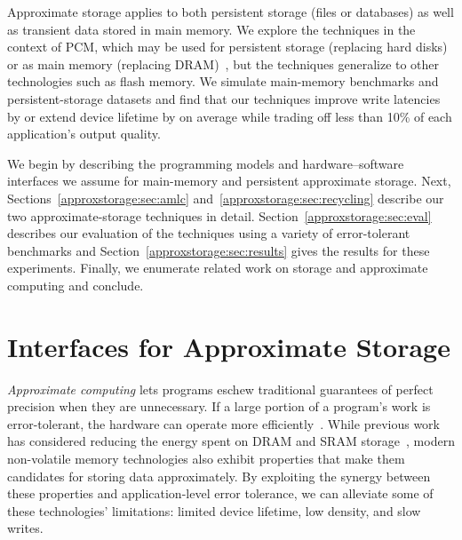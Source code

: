 Approximate storage applies to both persistent storage (files or databases) as well as transient
data stored in main memory.
We explore the techniques in the context of PCM, which may be used for
persistent storage (replacing hard disks) or as main memory
(replacing DRAM)~\cite{pcm-dram-alt,durable-pcm-mm,qureshi-pcm-mm},
but the techniques generalize to other technologies such as flash memory.
We simulate main-memory benchmarks and
persistent-storage datasets and find that our techniques improve write
latencies by  or extend device lifetime by
 on
average while trading off less than 10\% of each application's output quality.

We begin by describing the programming models and hardware--software interfaces
we assume for main-memory and persistent approximate storage. Next,
Sections~\ref{approxstorage:sec:amlc} and~\ref{approxstorage:sec:recycling} describe our two
approximate-storage techniques in detail. Section~\ref{approxstorage:sec:eval} describes our
evaluation of the techniques using a variety of error-tolerant
benchmarks and Section~\ref{approxstorage:sec:results} gives the results for these
experiments. Finally, we enumerate related work on storage and approximate
computing and conclude.

\section{Interfaces for Approximate Storage}
\label{approxstorage:sec:idea}


\emph{Approximate computing} lets programs
eschew traditional guarantees of perfect precision when they are
unnecessary. If a large portion of a program's work is
error-tolerant, the hardware can operate more
efficiently~\cite{flikker,truffle,pcmos,stochasticproc,relax}.
While previous work has considered reducing the energy spent on DRAM
and SRAM storage~\cite{flikker,enerj,truffle}, modern non-volatile
memory technologies also exhibit properties that make them candidates
for storing data approximately. By exploiting the synergy between
these properties and application-level error tolerance, we can alleviate
some of these technologies' limitations: limited device
lifetime, low density, and slow writes.

